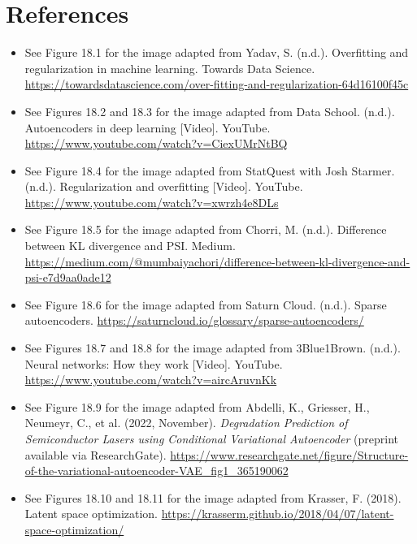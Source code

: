 \documentclass{article}
\begin{document}
\section{References}

\begin{itemize}

\item See Figure 18.1 for the image adapted from Yadav, S. (n.d.). Overfitting and regularization in machine learning. Towards Data Science. \url{https://towardsdatascience.com/over-fitting-and-regularization-64d16100f45c}

\item See Figures 18.2 and 18.3 for the image adapted from Data School. (n.d.). Autoencoders in deep learning [Video]. YouTube. \url{https://www.youtube.com/watch?v=CiexUMrNtBQ}

\item See Figure 18.4 for the image adapted from StatQuest with Josh Starmer. (n.d.). Regularization and overfitting [Video]. YouTube. \url{https://www.youtube.com/watch?v=xwrzh4e8DLs}

\item See Figure 18.5 for the image adapted from Chorri, M. (n.d.). Difference between KL divergence and PSI. Medium. \url{https://medium.com/@mumbaiyachori/difference-between-kl-divergence-and-psi-e7d9aa0ade12}

\item See Figure 18.6 for the image adapted from Saturn Cloud. (n.d.). Sparse autoencoders. \url{https://saturncloud.io/glossary/sparse-autoencoders/}

\item See Figures 18.7 and 18.8 for the image adapted from 3Blue1Brown. (n.d.). Neural networks: How they work [Video]. YouTube. \url{https://www.youtube.com/watch?v=aircAruvnKk}

\item See Figure 18.9 for the image adapted from Abdelli, K., Griesser, H., Neumeyr, C., et al. (2022, November). \textit{Degradation Prediction of Semiconductor Lasers using Conditional Variational Autoencoder} (preprint available via ResearchGate). \url{https://www.researchgate.net/figure/Structure-of-the-variational-autoencoder-VAE_fig1_365190062}

\item See Figures 18.10 and 18.11 for the image adapted from Krasser, F. (2018). Latent space optimization. \url{https://krasserm.github.io/2018/04/07/latent-space-optimization/}


\end{itemize}
\end{document}
